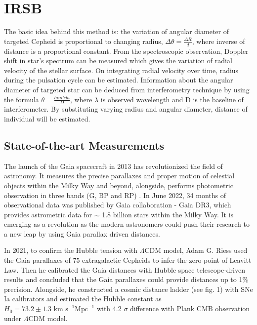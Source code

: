 \section{IRSB}
The basic idea behind this method is: the variation of angular diameter of targeted Cepheid is proportional to changing radius, $\Delta \theta = \frac{\Delta R}{d}$, where inverse of distance is a proportional constant. From the spectroscopic observation, Doppler shift in star's spectrum can be measured which gives the variation of radial velocity of the stellar surface. On integrating radial velocity over time, radius during the pulsation cycle can be estimated. Information about the angular diameter of targeted star can be deduced from interferometry technique by using the formula $\theta = \frac{lambda}{D}$, where $\lambda$ is observed wavelength and D is the baseline of interferometer. By substituting varying radius and angular diameter, distance of individual will be estimated. 


\subsection*{State-of-the-art Measurements}

The launch of the Gaia spacecraft in 2013 has revolutionized the field of astronomy. It measures the precise parallaxes and proper motion of celestial objects within the Milky Way and beyond, alongside, performs photometric observation in three bands (G, BP and RP) \cite{vallenari2022gaia} \cite{bailer2021estimating}. In June 2022, 34 months of observational data was published by Gaia collaboration - Gaia DR3, which provides astrometric data for $\sim$ 1.8 billion stars within the Milky Way. It is emerging as a revolution as the modern astronomers could push their research to a new leap by using Gaia parallax driven distances. 


In 2021, to confirm the Hubble tension with $\Lambda\mbox{CDM}$ model, Adam G. Riess used the Gaia parallaxes of 75 extragalactic Cepheids \cite{riess2021cosmic} to infer the zero-point of Leavitt Law. Then he calibrated the Gaia distances with Hubble space telescope-driven results and concluded that the Gaia parallaxes could provide distances up to 1\% precision. Alongside, he constructed a cosmic distance ladder (see fig. 1) with SNe Ia calibrators and estimated the Hubble constant as $H_0 = 73.2 \pm 1.3 \mbox{ km  s}^{-1} \mbox{Mpc}^{-1}$ with 4.2 $\sigma$ difference with Plank CMB observation under $\Lambda$CDM model.  


